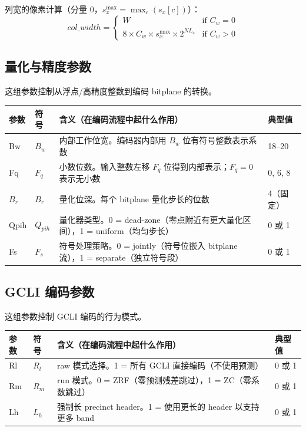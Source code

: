 列宽的像素计算（分量 0，$s_x^{\max} = \max_c(s_x[c])$）：
\begin{equation}
\mathit{col\_width} = \begin{cases}
W & \text{if } C_w = 0 \\
8 \times C_w \times s_x^{\max} \times 2^{NL_x} & \text{if } C_w > 0
\end{cases}
\end{equation}

\subsection{量化与精度参数}

这组参数控制从浮点/高精度整数到编码 bitplane 的转换。

\begin{table}[H]
\centering
\begin{tabular}{@{}llp{5.5cm}l@{}}
\toprule
参数 & 符号 & 含义（在编码流程中起什么作用） & 典型值 \\
\midrule
Bw & $B_w$ & 内部工作位宽。编码器内部用 $B_w$ 位有符号整数表示系数 & 18--20 \\
Fq & $F_q$ & 小数位数。输入整数左移 $F_q$ 位得到内部表示；$F_q = 0$ 表示无小数 & 0, 6, 8 \\
$B_r$ & $B_r$ & 量化位深。每个 bitplane 量化步长的位数 & 4（固定） \\
Qpih & $Q_{pih}$ & 量化器类型。0 = dead-zone（零点附近有更大量化区间），1 = uniform（均匀步长） & 0 或 1 \\
Fs & $F_s$ & 符号处理策略。0 = jointly（符号位嵌入 bitplane 流），1 = separate（独立符号段） & 0 或 1 \\
\bottomrule
\end{tabular}
\end{table}

\subsection{GCLI 编码参数}

这组参数控制 GCLI 编码的行为模式。

\begin{table}[H]
\centering
\begin{tabular}{@{}llp{5.5cm}l@{}}
\toprule
参数 & 符号 & 含义（在编码流程中起什么作用） & 典型值 \\
\midrule
Rl & $R_l$ & raw 模式选择。1 = 所有 GCLI 直接编码（不使用预测） & 0 或 1 \\
Rm & $R_m$ & run 模式。0 = ZRF（零预测残差跳过），1 = ZC（零系数跳过） & 0 或 1 \\
Lh & $L_h$ & 强制长 precinct header。1 = 使用更长的 header 以支持更多 band & 0 或 1 \\
\bottomrule
\end{tabular}
\end{table}

